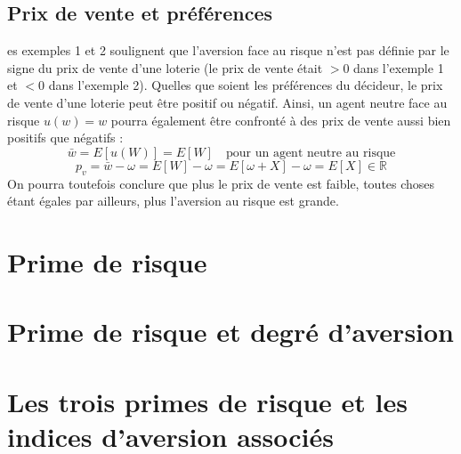 \documentclass[a4paper, 12pt]{report}
\begin{document}
\subsection{Prix de vente et préférences}

es exemples 1 et 2 soulignent que l'aversion face au risque n'est pas définie par le signe du prix de vente d'une loterie (le prix de vente était \( > 0 \) dans l'exemple 1 et \( < 0 \) dans l'exemple 2). Quelles que soient les préférences du décideur, le prix de vente d'une loterie peut être positif ou négatif. Ainsi, un agent neutre face au risque \( u(w) = w \) pourra également être confronté à des prix de vente aussi bien positifs que négatifs : 
\[
\bar{w} = E[u(W)] = E[W] \quad \text{pour un agent neutre au risque}
\]
\[
p_v = \bar{w} - \omega = E[W] - \omega = E[\omega + X] - \omega = E[X] \in \mathbb{R}
\]
On pourra toutefois conclure que plus le prix de vente est faible, toutes choses étant égales par ailleurs, plus l'aversion au risque est grande.

\section{Prime de risque}


\section{Prime de risque et degré d'aversion}


\section{ Les trois primes de risque et les indices d'aversion associés}
\end{document}
